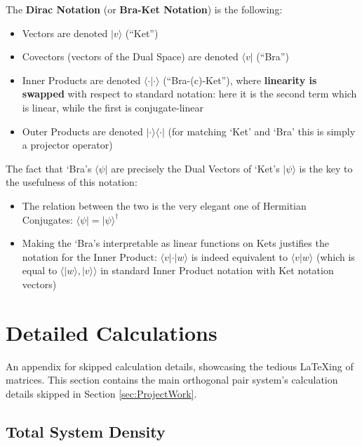 \documentclass[a4paper,12pt]{article}
\begin{document}
\begin{defn}\label{def:DiracNotation}
    The \textbf{Dirac Notation} (or \textbf{Bra-Ket Notation}) is the following:
    \begin{itemize}[noitemsep]
        \item Vectors are denoted $|v\rangle$ (``Ket'')
        \item Covectors (vectors of the \gls{Dual Space}) are denoted $\langle v|$ (``Bra'')
        \item Inner Products are denoted $\langle\cdot|\cdot\rangle$ (``Bra-(c)-Ket''), where \textbf{linearity is swapped} with respect to standard notation:
            here it is the second term which is linear, while the first is conjugate-linear
        \item Outer Products are denoted $|\cdot\rangle\langle\cdot|$ (for matching `Ket' and `Bra' this is simply a projector operator)
    \end{itemize}
    The fact that `Bra's $\langle\psi|$ are precisely the Dual Vectors of `Ket's $|\psi\rangle$ is the key to the usefulness of this notation:
    \begin{itemize}[noitemsep]
        \item The relation between the two is the very elegant one of \glspl{Hermitian Conjugate}: $\langle\psi| = |\psi\rangle^{\dagger}$
        \item Making the `Bra's interpretable as linear functions on Kets justifies the notation for the Inner Product: $\langle v| \cdot |w\rangle$ is indeed
            equivalent to $\langle v|w \rangle$ (which is equal to $\langle |w\rangle,|v\rangle \rangle$ in standard Inner Product notation with Ket notation vectors)
    \end{itemize}
\end{defn}


 


\section{Detailed Calculations}
\label{sec:DetailedCalculations}

An appendix for skipped calculation details, showcasing the tedious LaTeXing of matrices.
This section contains the main orthogonal pair system's calculation details skipped in Section \ref{sec:ProjectWork}.



\subsection{Total System Density}
\label{sec:SubTotSymDens}
\end{document}
